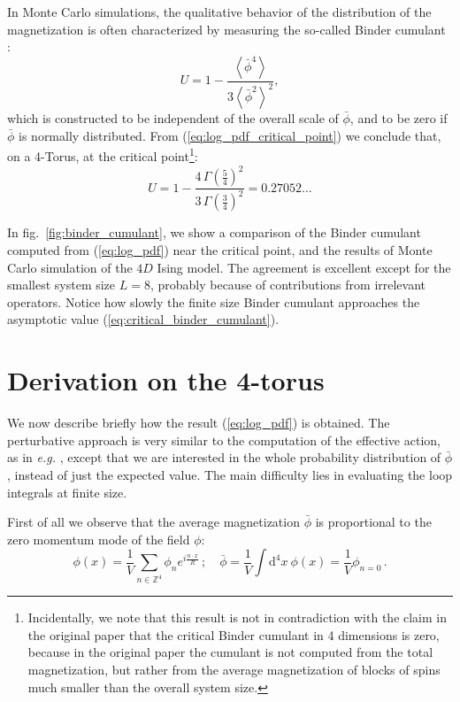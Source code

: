 \documentclass[11pt,a4paper]{article}
\newcommand{\dd}{\mathrm{d}}
\begin{document}
In Monte Carlo simulations, the qualitative behavior of the distribution of the
magnetization is often characterized by measuring the so-called Binder
cumulant \cite{Binder1981}:
\begin{equation}
    U = 1 - \frac{\left\langle \bar \phi^4 \right \rangle}
    {3\left\langle \bar \phi^2 \right \rangle^2},
\end{equation}
which is constructed to be independent of the overall scale of $\bar{\phi}$,
and to be zero if $\bar{\phi}$ is normally distributed. From
(\ref{eq:log_pdf_critical_point}) we conclude that, on a 4-Torus, at the
critical point\footnote{ Incidentally, we note that this result is not in
contradiction with the claim in the original paper \cite{Binder1981} that the
critical Binder cumulant in 4 dimensions is zero, because in the original paper
the cumulant is not computed from the total magnetization, but rather from the
average magnetization of blocks of spins much smaller than the overall system
size.}:
\begin{equation}
    \label{eq:critical_binder_cumulant}
    U = 1 - \frac{4\,\Gamma\left(\frac{5}{4}\right)^2}
    {3\,\Gamma\left(\frac{3}{4}\right)^2} 
    = 0.27052\ldots
\end{equation}


In fig.~\ref{fig:binder_cumulant}, we show a comparison of the Binder cumulant
computed from (\ref{eq:log_pdf}) near the critical point, and the results of
Monte Carlo simulation of the $4D$ Ising model. The agreement is excellent except
for the smallest system size $L = 8$, probably because of contributions from
irrelevant operators. Notice how slowly the finite size Binder cumulant
approaches the asymptotic value (\ref{eq:critical_binder_cumulant}).

\section{Derivation on the 4-torus}
\label{sect:derivation}

We now describe briefly how the result (\ref{eq:log_pdf}) is obtained. The
perturbative approach is very similar to the computation of the effective
action, as in \textit{e.g.} \cite{WeinbergEffectiveAction}, except that we are
interested in the whole probability distribution of $\bar{\phi}$, instead of
just the expected value. The main difficulty lies in evaluating the loop
integrals at finite size.

First of all we observe that the average magnetization
$\bar{\phi}$ is proportional to the zero momentum mode of the field $\phi$:
\begin{equation}
    \phi(x) = \frac{1}{V} \sum_{n \in \mathbb{Z}^4} \phi_{n} 
    e^{i \frac{n\cdot x}{R}}\,;\quad \bar{\phi} = \frac{1}{V}\int\dd^4 x\ \phi(x) = \frac{1}{V}\phi_{n = 0}\,.
\end{equation}
\end{document}
